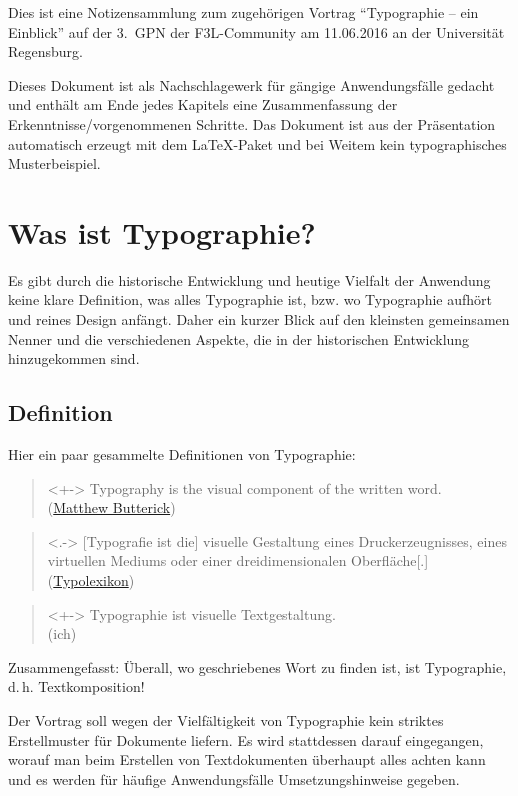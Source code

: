
Dies ist eine Notizensammlung zum zugehörigen Vortrag
\enquote{Typographie – ein Einblick} auf der 3.~GPN der
F3L-Community am 11.06.2016 an der Universität Regensburg.

Dieses Dokument ist als Nachschlagewerk für gängige Anwendungsfälle
gedacht und enthält am Ende jedes Kapitels eine Zusammenfassung der
Erkenntnisse/vorgenommenen Schritte.
Das Dokument ist aus der Präsentation automatisch erzeugt mit dem
\LaTeX-Paket  und bei Weitem kein typographisches
Musterbeispiel.

\section{Was ist Typographie?}
\frame{\sectionpage}
Es gibt durch die historische Entwicklung und heutige Vielfalt der
Anwendung keine klare Definition, was alles Typographie ist, bzw. wo
Typographie aufhört und reines Design anfängt.
Daher ein kurzer Blick auf den kleinsten gemeinsamen Nenner und die
verschiedenen Aspekte, die in der historischen Entwicklung
hinzugekommen sind.

\subsection{Definition}
Hier ein paar gesammelte Definitionen von Typographie: 
\begin{frame}
  \begin{quote}<+->
    Typography is the visual component of the written word. \\
    (\href{http://practicaltypography.com/}{Matthew Butterick})
  \end{quote}
  \begin{quote}<.->
    [Typografie ist die] visuelle Gestaltung eines Druckerzeugnisses,
    eines virtuellen Mediums oder einer dreidimensionalen Oberfläche[.]\\
    (\href{http://www.typolexikon.de/typographie/}{Typolexikon})
  \end{quote}
  \begin{quote}<+->
    Typographie ist visuelle Textgestaltung.\\
    (ich)
  \end{quote}
\end{frame}
Zusammengefasst: Überall, wo geschriebenes Wort zu finden ist, ist
Typographie, d.\,h. Textkomposition!

Der Vortrag soll wegen der Vielfältigkeit von Typographie kein striktes
Erstellmuster für Dokumente liefern. Es wird stattdessen darauf
eingegangen, worauf man beim Erstellen von Textdokumenten überhaupt alles
achten kann und es werden für häufige Anwendungsfälle Umsetzungshinweise
gegeben.


